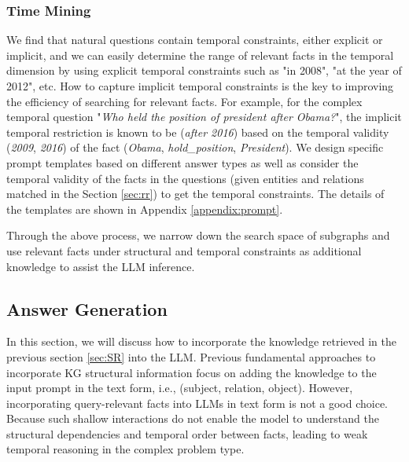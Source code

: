 \documentclass[11pt]{article}
\begin{document}
\subsubsection{Time Mining}

We find that natural questions contain temporal constraints, either explicit or implicit, and we can easily determine the range of relevant facts in the temporal dimension by using explicit temporal constraints such as "in 2008", "at the year of 2012", etc.
How to capture implicit temporal constraints is the key to improving the efficiency of searching for relevant facts.
For example, for the complex temporal question "\textit{Who held the position of president after Obama?}", the implicit temporal restriction is known to be (\textit{after 2016}) based on the temporal validity (\textit{2009}, \textit{2016}) of the fact (\textit{Obama}, \textit{hold\_position}, \textit{President}). 
We design specific prompt templates based on different answer types as well as consider the temporal validity of the facts in the questions (given entities and relations matched in the Section \ref{sec:rr}) to get the temporal constraints. The details of the templates are shown in Appendix \ref{appendix:prompt}.

Through the above process, we narrow down the search space of subgraphs and use relevant facts under structural and temporal constraints as additional knowledge to assist the LLM inference.

\subsection{Answer Generation}

In this section, we will discuss how to incorporate the knowledge retrieved in the previous section \ref{sec:SR} into the LLM.
Previous fundamental approaches to incorporate KG structural information focus on adding the knowledge to the input prompt in the text form, i.e., (subject, relation, object).
However, incorporating query-relevant facts into LLMs in text form is not a good choice. 
Because such shallow interactions do not enable the model to understand the structural dependencies and temporal order between facts, leading to weak temporal reasoning in the complex problem type.
\end{document}
